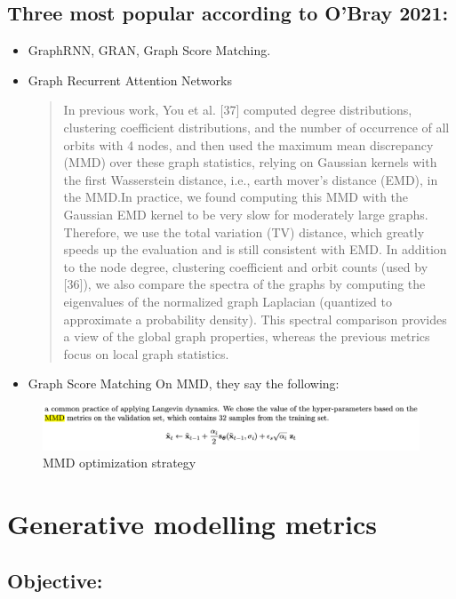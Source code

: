 \documentclass[12pt]{article}
\begin{document}
\subsection{Three most popular according to O'Bray 2021:}
\label{sec:orgfad32cc}
\begin{itemize}
\item GraphRNN, GRAN, Graph Score Matching.

\item Graph Recurrent Attention Networks
\begin{quote}
In previous work, You et al. [37] computed degree distributions, clustering
coefficient distributions, and the number of occurrence of all orbits with 4
nodes, and then used the maximum mean discrepancy (MMD) over these graph
statistics, relying on Gaussian kernels with the first Wasserstein distance,
i.e., earth mover’s distance (EMD), in the MMD.In practice, we found computing
this MMD with the Gaussian EMD kernel to be very slow for moderately large
graphs. Therefore, we use the total variation (TV) distance, which greatly
speeds up the evaluation and is still consistent with EMD. In addition to the
node degree, clustering coefficient and orbit counts (used by [36]), we also
compare the spectra of the graphs by computing the eigenvalues of the
normalized graph Laplacian (quantized to approximate a probability density).
This spectral comparison provides a view of the global graph properties,
whereas the previous metrics focus on local graph statistics.
\end{quote}

\item Graph Score Matching
On MMD, they say the following:
\end{itemize}
\begin{figure}[htbp]
\centering
\includegraphics[width=\linewidth]{./images/MMD_settings_graph_score_matching_paper.png}
\caption{\label{fig:MMD settings for evaluation of the graph score matching model}MMD optimization strategy}
\end{figure}

\section{Generative modelling metrics}
\label{sec:org6ba30de}
\subsection{Objective:}
\label{sec:org9931b1d}
\end{document}
